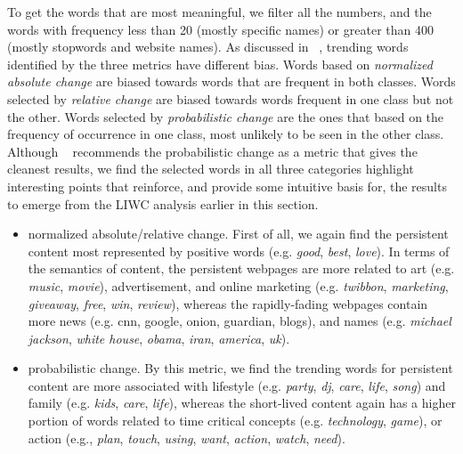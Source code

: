 \documentclass[phd,tocprelim]{cornell}
\begin{document}
To get the words that are most meaningful, we filter all the numbers, and the words with frequency less than 20 (mostly specific names) or greater than 400 (mostly stopwords and website names). As discussed in ~\cite{Kleinberg:2004}, trending words identified by the three metrics have different bias. Words based on \emph{normalized absolute change} are biased towards words that are frequent in both classes. Words selected by \emph{relative change} are biased towards words frequent in one class but not the other. Words selected by \emph{probabilistic change} are the ones that based on the frequency of occurrence in one class, most unlikely to be seen in the other class. Although ~\cite{Kleinberg:2004} recommends the probabilistic change as a metric that gives the cleanest results, 
we find the selected words in all three categories highlight
interesting points that reinforce, and provide some intuitive basis for,
the results to emerge from the LIWC analysis earlier in this section.
\begin{itemize}
\item normalized absolute/relative change. First of all, we again find the persistent content most represented by positive words (e.g. \emph{good}, \emph{best}, \emph{love}). In terms of the semantics of content, the persistent webpages are more related to art (e.g. \emph{music}, \emph{movie}), advertisement, and online marketing (e.g. \emph{twibbon}, \emph{marketing}, \emph{giveaway}, \emph{free}, \emph{win}, \emph{review}), whereas the rapidly-fading webpages contain more news (e.g. cnn, google, onion, guardian, blogs), and names (e.g. \emph{michael jackson}, \emph{white house}, \emph{obama}, \emph{iran}, \emph{america}, \emph{uk}).
\item probabilistic change. By this metric, we find the trending words for persistent content are more associated with lifestyle (e.g. \emph{party}, \emph{dj}, \emph{care}, \emph{life}, \emph{song}) and family (e.g. \emph{kids}, \emph{care}, \emph{life}), whereas the short-lived content again has a higher portion of words related to time critical concepts (e.g. \emph{technology}, \emph{game}), or action (e.g., \emph{plan}, \emph{touch}, \emph{using}, \emph{want}, \emph{action}, \emph{watch}, \emph{need}).
\end{itemize}
\end{document}
